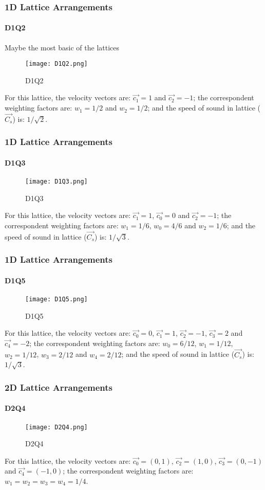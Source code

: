\documentclass[12pt]{beamer}
\begin{document}
\begin{frame}
  \frametitle{1D Lattice Arrangements}
  \framesubtitle{D1Q2}
  Maybe the most basic of the lattices
  \begin{figure}
    \centering
    \texttt{[image: D1Q2.png]}
    \caption{D1Q2}
  \end{figure}
  For this lattice, the velocity vectors are: $\vec{c_1}=1$ and $\vec{c_2}=-1$;
  the correspondent weighting factors are: $w_1=1/2$ and $w_2=1/2$;
  and the speed of sound in lattice ($\vec{C_s}$) is: $1/\sqrt{2}$.
\end{frame}

\begin{frame}
  \frametitle{1D Lattice Arrangements}
  \framesubtitle{D1Q3}
  \begin{figure}
    \centering
    \texttt{[image: D1Q3.png]}
    \caption{D1Q3}
  \end{figure}
  For this lattice, the velocity vectors are: $\vec{c_1}=1$, 
  $\vec{c_0}=0$  and $\vec{c_2}=-1$;
  the correspondent weighting factors are: $w_1=1/6$, $w_0=4/6$ and $w_2=1/6$;
  and the speed of sound in lattice ($\vec{C_s}$) is: $1/\sqrt{3}$.
\end{frame}

\begin{frame}
  \frametitle{1D Lattice Arrangements}
  \framesubtitle{D1Q5}
  \begin{figure}
    \centering
    \texttt{[image: D1Q5.png]}
    \caption{D1Q5}
  \end{figure}
  For this lattice, the velocity vectors are: $\vec{c_0}=0$, 
  $\vec{c_1}=1$, $\vec{c_2}=-1$, 
  $\vec{c_3}=2$ and $\vec{c_4}=-2$;
  the correspondent weighting factors are: $w_0=6/12$, $w_1=1/12$, 
  $w_2=1/12$, $w_3=2/12$ and $w_4=2/12$; and the speed of sound in lattice 
  ($\vec{C_s}$) is: $1/\sqrt{3}$.
\end{frame}

\begin{frame}
  \frametitle{2D Lattice Arrangements}
  \framesubtitle{D2Q4}
  \begin{figure}
    \centering
    \texttt{[image: D2Q4.png]}
    \caption{D2Q4}
  \end{figure}
  For this lattice, the velocity vectors are: $\vec{c_0}=(0,1)$, 
  $\vec{c_2}=(1,0)$, $\vec{c_3}=(0,-1)$ and 
  $\vec{c_4}=(-1,0)$; the correspondent weighting factors are: 
  $w_1=w_2=w_3=w_4=1/4$.
\end{frame}
\end{document}
